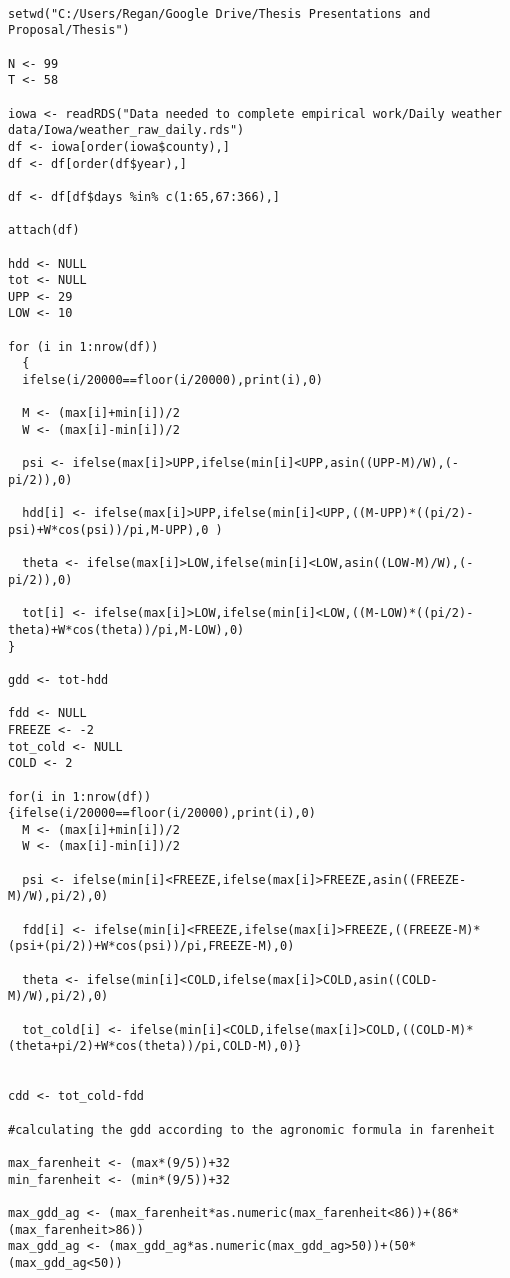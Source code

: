 \begin{lstlisting}

setwd("C:/Users/Regan/Google Drive/Thesis Presentations and Proposal/Thesis")

N <- 99
T <- 58

iowa <- readRDS("Data needed to complete empirical work/Daily weather data/Iowa/weather_raw_daily.rds")
df <- iowa[order(iowa$county),]
df <- df[order(df$year),]

df <- df[df$days %in% c(1:65,67:366),]

attach(df)

hdd <- NULL
tot <- NULL
UPP <- 29
LOW <- 10

for (i in 1:nrow(df))
  {
  ifelse(i/20000==floor(i/20000),print(i),0)
  
  M <- (max[i]+min[i])/2
  W <- (max[i]-min[i])/2

  psi <- ifelse(max[i]>UPP,ifelse(min[i]<UPP,asin((UPP-M)/W),(-pi/2)),0)

  hdd[i] <- ifelse(max[i]>UPP,ifelse(min[i]<UPP,((M-UPP)*((pi/2)-psi)+W*cos(psi))/pi,M-UPP),0 )

  theta <- ifelse(max[i]>LOW,ifelse(min[i]<LOW,asin((LOW-M)/W),(-pi/2)),0)

  tot[i] <- ifelse(max[i]>LOW,ifelse(min[i]<LOW,((M-LOW)*((pi/2)-theta)+W*cos(theta))/pi,M-LOW),0)
}

gdd <- tot-hdd

fdd <- NULL
FREEZE <- -2
tot_cold <- NULL
COLD <- 2

for(i in 1:nrow(df))
{ifelse(i/20000==floor(i/20000),print(i),0)
  M <- (max[i]+min[i])/2
  W <- (max[i]-min[i])/2

  psi <- ifelse(min[i]<FREEZE,ifelse(max[i]>FREEZE,asin((FREEZE-M)/W),pi/2),0)
  
  fdd[i] <- ifelse(min[i]<FREEZE,ifelse(max[i]>FREEZE,((FREEZE-M)*(psi+(pi/2))+W*cos(psi))/pi,FREEZE-M),0)
  
  theta <- ifelse(min[i]<COLD,ifelse(max[i]>COLD,asin((COLD-M)/W),pi/2),0)
  
  tot_cold[i] <- ifelse(min[i]<COLD,ifelse(max[i]>COLD,((COLD-M)*(theta+pi/2)+W*cos(theta))/pi,COLD-M),0)}


cdd <- tot_cold-fdd

#calculating the gdd according to the agronomic formula in farenheit

max_farenheit <- (max*(9/5))+32
min_farenheit <- (min*(9/5))+32

max_gdd_ag <- (max_farenheit*as.numeric(max_farenheit<86))+(86*(max_farenheit>86))
max_gdd_ag <- (max_gdd_ag*as.numeric(max_gdd_ag>50))+(50*(max_gdd_ag<50))


\end{lstlisting}
